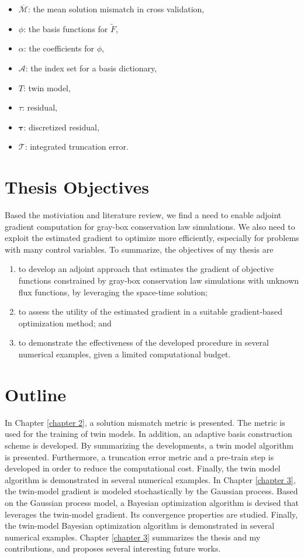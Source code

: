 \begin{itemize}
    \item $\overline{\mathcal{M}}$: the mean solution mismatch in cross validation,
    \item $\phi$: the basis functions for $\tilde{F}$,
    \item $\alpha$: the coefficients for $\phi$,
    \item $\mathcal{A}$: the index set for a basis dictionary,
    \item $T$: twin model,
    \item $\tau$: residual,
    \item $\boldsymbol{\tau}$: discretized residual,
    \item $\mathcal{T}$: integrated truncation error.
\end{itemize}
 


\section{Thesis Objectives}
Based the motiviation and literature review, we find a need to enable adjoint
gradient computation for gray-box conservation law simulations. We also need to 
exploit the estimated gradient to optimize more efficiently, 
especially for problems with many control variables. 
To summarize, the objectives of my thesis are
\begin{enumerate}
    \item to develop an adjoint approach that estimates the gradient of objective functions
          constrained by gray-box conservation law simulations with unknown flux functions,
          by leveraging the space-time solution;
    \item to assess the utility of the estimated gradient in a suitable 
          gradient-based optimization method; and
    \item to demonstrate the effectiveness of the developed procedure in several numerical examples,
          given a limited computational budget.
\end{enumerate}


\section{Outline}
In Chapter \ref{chapter 2}, a solution mismatch metric is presented. The metric
is used for the training of twin models.  In addition, an adaptive basis construction scheme 
is developed. By summarizing the developments, a twin model algorithm is presented. Furthermore,
a truncation error metric and a pre-train step is developed in order to reduce the computational cost.
Finally, the twin model algorithm is demonstrated in several numerical examples.
In Chapter \ref{chapter 3}, the twin-model gradient is modeled stochastically by the Gaussian process.
Based on the Gaussian process model, 
a Bayesian optimization algorithm is devised that leverages the twin-model gradient.
Its convergence properties are studied. Finally, the twin-model Bayesian optimization algorithm
is demonstrated in several numerical examples. Chapter \ref{chapter 3} summarizes the thesis and
my contributions, and proposes several interesting future works.

